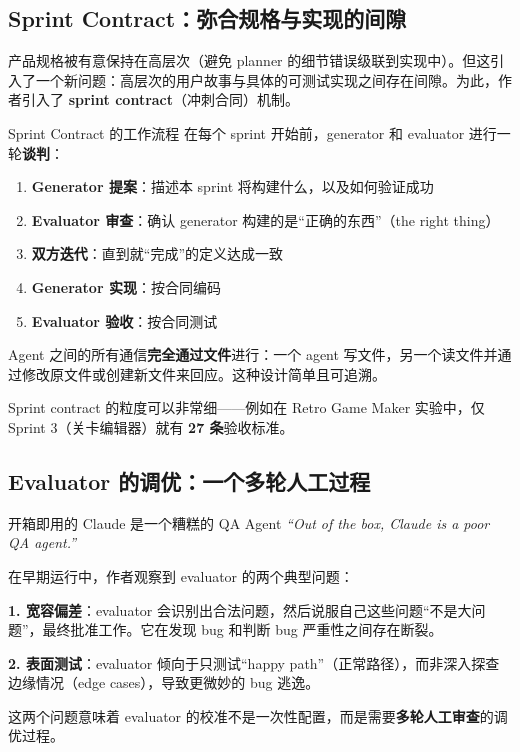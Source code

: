 \documentclass[a4paper]{article}
\begin{document}
\subsection{Sprint Contract：弥合规格与实现的间隙}

产品规格被有意保持在高层次（避免 planner 的细节错误级联到实现中）。但这引入了一个新问题：高层次的用户故事与具体的可测试实现之间存在间隙。为此，作者引入了 \textbf{sprint contract}（冲刺合同）机制。

\begin{knowledgebox}{Sprint Contract 的工作流程}
在每个 sprint 开始前，generator 和 evaluator 进行一轮\textbf{谈判}：

\begin{enumerate}[leftmargin=1.5em]
    \item \textbf{Generator 提案}：描述本 sprint 将构建什么，以及如何验证成功
    \item \textbf{Evaluator 审查}：确认 generator 构建的是``正确的东西''（the right thing）
    \item \textbf{双方迭代}：直到就``完成''的定义达成一致
    \item \textbf{Generator 实现}：按合同编码
    \item \textbf{Evaluator 验收}：按合同测试
\end{enumerate}

Agent 之间的所有通信\textbf{完全通过文件}进行：一个 agent 写文件，另一个读文件并通过修改原文件或创建新文件来回应。这种设计简单且可追溯。
\end{knowledgebox}

Sprint contract 的粒度可以非常细——例如在 Retro Game Maker 实验中，仅 Sprint 3（关卡编辑器）就有 \textbf{27 条}验收标准。

\subsection{Evaluator 的调优：一个多轮人工过程}

\begin{warningbox}{开箱即用的 Claude 是一个糟糕的 QA Agent}
\textit{``Out of the box, Claude is a poor QA agent.''}

在早期运行中，作者观察到 evaluator 的两个典型问题：

\textbf{1. 宽容偏差}：evaluator 会识别出合法问题，然后说服自己这些问题``不是大问题''，最终批准工作。它在发现 bug 和判断 bug 严重性之间存在断裂。

\textbf{2. 表面测试}：evaluator 倾向于只测试``happy path''（正常路径），而非深入探查边缘情况（edge cases），导致更微妙的 bug 逃逸。

这两个问题意味着 evaluator 的校准不是一次性配置，而是需要\textbf{多轮人工审查}的调优过程。
\end{warningbox}
\end{document}
